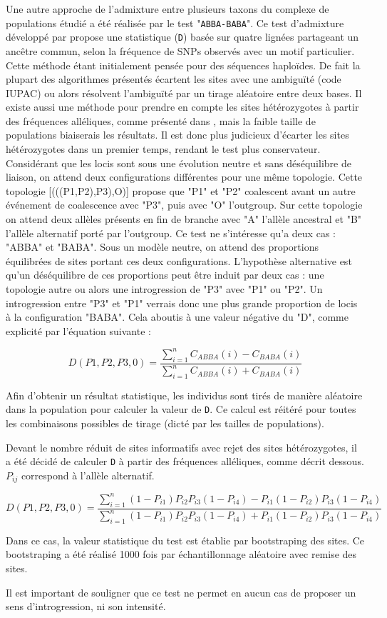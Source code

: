 Une autre approche de l'admixture entre plusieurs taxons du complexe de populations étudié a été réalisée par le test "\verb|ABBA-BABA|".
 Ce test d'admixture développé par \citet{Durand2011} propose une statistique (\verb|D|) basée sur quatre lignées partageant un ancêtre commun, selon la fréquence de SNPs observés avec un motif particulier.
 Cette méthode étant initialement pensée pour des séquences haploïdes.
 De fait la plupart des algorithmes présentés écartent les sites avec une ambiguïté (code IUPAC) ou alors résolvent l’ambiguïté par un tirage aléatoire entre deux bases.
 Il existe aussi une méthode pour prendre en compte les sites hétérozygotes à partir des fréquences alléliques, comme présenté dans \citet{Durand2011}, mais la faible taille de populations biaiserais les résultats.
 Il est donc plus judicieux d'écarter les sites hétérozygotes dans un premier temps, rendant le test plus conservateur.
 Considérant que les locis sont sous une évolution neutre et sans déséquilibre de liaison, on attend deux configurations différentes pour une même topologie.
 Cette topologie [(((P1,P2),P3),O)] propose que "P1" et "P2" coalescent avant un autre événement de coalescence avec "P3", puis avec "O" l'outgroup.
 Sur cette topologie on attend deux allèles présents en fin de branche avec "A" l'allèle ancestral et "B" l'allèle alternatif porté par l'outgroup.
 Ce test ne s'intéresse qu'a deux cas : "ABBA" et "BABA".
 Sous un modèle neutre, on attend des proportions équilibrées de sites portant ces deux configurations.
 L'hypothèse alternative est qu'un déséquilibre de ces proportions peut être induit par deux cas : une topologie autre ou alors une introgression de "P3" avec "P1" ou "P2".
 Un introgression entre "P3" et "P1" verrais donc une plus grande proportion de locis à la configuration "BABA".
 Cela aboutis à une valeur négative du "D", comme explicité par l'équation suivante :

\[D(P1,P2,P3,0)=\frac{\sum_{i=1}^{n} C_{ABBA}(i)-C_{BABA}(i)}{\sum_{i=1}^{n} C_{ABBA}(i)+C_{BABA}(i)}\]

Afin d'obtenir un résultat statistique, les individus sont tirés de manière aléatoire dans la population pour calculer la valeur de \verb|D|.
 Ce calcul est réitéré pour toutes les combinaisons possibles de tirage (dicté par les tailles de populations). 

Devant le nombre réduit de sites informatifs avec rejet des sites hétérozygotes, il a été décidé de calculer \verb|D| à partir des fréquences alléliques, comme décrit dessous.
 \textit{$P_{ij}$} correspond à l'allèle alternatif.

\[D(P1,P2,P3,0)=\frac{\sum_{i=1}^{n} (1-P_{i1})P_{i2}P_{i3}(1-P_{i4})-P_{i1}(1-P_{i2})P_{i3}(1-P_{i4})}{\sum_{i=1}^{n} (1-P_{i1})P_{i2}P_{i3}(1-P_{i4})+P_{i1}(1-P_{i2})P_{i3}(1-P_{i4})}\]

Dans ce cas, la valeur statistique du test est établie par bootstraping des sites. Ce bootstraping a été réalisé 1000 fois par échantillonnage aléatoire avec remise des sites.

Il est important de souligner que ce test ne permet en aucun cas de proposer un sens d'introgression, ni son intensité.


